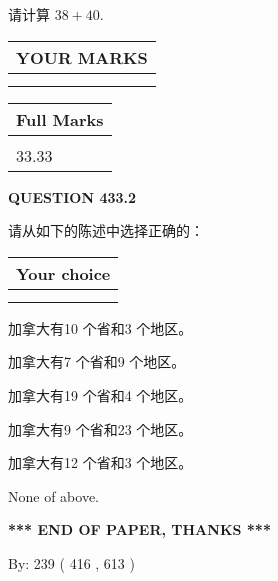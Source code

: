 \documentclass{ctexart}
\begin{document}
  
 
请计算 $ %
38 +  %
40 $.
 

 

 
  
\vspace{0.2in}
  
\noindent\begin{tabular}{|l|}
\hline
 YOUR MARKS  \\
\hline
 \\ 
 \\ 
\hline
\end{tabular}
\hspace{0.05in} \begin{tabular}{|l|}
\hline
 Full Marks  \\
\hline
 \\ 
33.33 \\
\hline
\end{tabular}
{\textbf{\Large{QUESTION
433.2 
}}}
  
  
请从如下的陈述中选择正确的：
  
  
\noindent\hspace{3.0in} \begin{tabular}{|l|}
\hline
Your choice \\
\hline
 \\ 
 \\ 
\hline
\end{tabular}
  
  
 
 
加拿大有10 个省和3 个地区。
 
 
加拿大有7 个省和9 个地区。
 
 
加拿大有19 个省和4 个地区。
 
 
加拿大有9 个省和23 个地区。
 
 
加拿大有12 个省和3 个地区。
 
 
 None of above.
 
 
   
   
 \vspace{0.2in}
 
   
   
   
   
\vspace{1.0in} 
{\textbf{\large{ *** END OF PAPER, THANKS *** }}} 
   
   
\hspace{1.0in} By: 
 239 ( 416 ,  613 )
   
\end{document}
